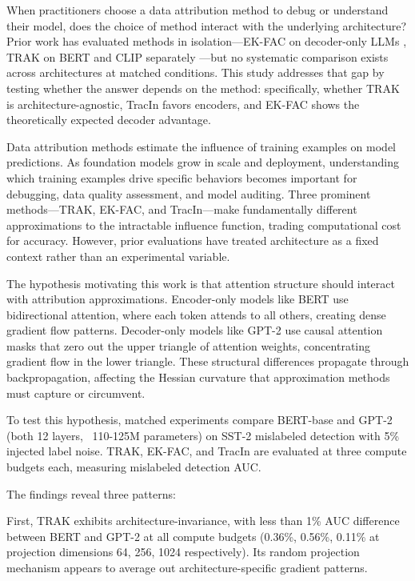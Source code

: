 
When practitioners choose a data attribution method to debug or understand their model, does the choice of method interact with the underlying architecture? Prior work has evaluated methods in isolation---EK-FAC on decoder-only LLMs \citep{grosse2023studying}, TRAK on BERT and CLIP separately \citep{park2023trak}---but no systematic comparison exists across architectures at matched conditions. This study addresses that gap by testing whether the answer depends on the method: specifically, whether TRAK is architecture-agnostic, TracIn favors encoders, and EK-FAC shows the theoretically expected decoder advantage.

Data attribution methods estimate the influence of training examples on model predictions. As foundation models grow in scale and deployment, understanding which training examples drive specific behaviors becomes important for debugging, data quality assessment, and model auditing. Three prominent methods---TRAK, EK-FAC, and TracIn---make fundamentally different approximations to the intractable influence function, trading computational cost for accuracy. However, prior evaluations have treated architecture as a fixed context rather than an experimental variable.

The hypothesis motivating this work is that attention structure should interact with attribution approximations. Encoder-only models like BERT use bidirectional attention, where each token attends to all others, creating dense gradient flow patterns. Decoder-only models like GPT-2 use causal attention masks that zero out the upper triangle of attention weights, concentrating gradient flow in the lower triangle. These structural differences propagate through backpropagation, affecting the Hessian curvature that approximation methods must capture or circumvent.

To test this hypothesis, matched experiments compare BERT-base and GPT-2 (both 12 layers, ~110-125M parameters) on SST-2 mislabeled detection with 5\% injected label noise. TRAK, EK-FAC, and TracIn are evaluated at three compute budgets each, measuring mislabeled detection AUC.

The findings reveal three patterns:

First, TRAK exhibits architecture-invariance, with less than 1\% AUC difference between BERT and GPT-2 at all compute budgets (0.36\%, 0.56\%, 0.11\% at projection dimensions 64, 256, 1024 respectively). Its random projection mechanism appears to average out architecture-specific gradient patterns.

